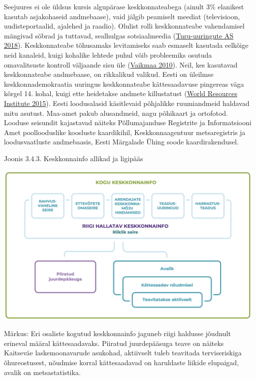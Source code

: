 \documentclass[estonian,]{article}
\begin{document}
Seejuures ei ole üldsus kursis algupärase keskkonnateabega (ainult 3\% elanikest kasutab asjakohaseid andmebaase), vaid jälgib peamiselt meediat (televisioon, uudisteportaalid, ajalehed ja raadio). Olulist rolli keskkonnateabe vahendamisel mängivad sõbrad ja tuttavad, sealhulgas sotsiaalmeedia (\protect\hyperlink{Turu-uuringute2018}{Turu-uuringute AS 2018}). Keskkonnateabe tõhusamaks levitamiseks saab esmaselt kasutada eelkõige neid kanaleid, kuigi kohalike lehtede puhul võib probleemiks osutuda omavalitsuste kontroll väljaande sisu üle (\protect\hyperlink{Vaikmaa2010}{Vaikmaa 2010}).
Neil, kes kasutavad keskkonnateabe andmebaase, on rikkalikud valikud. Eesti on üleilmse keskkonnademokraatia uuringus keskkonnateabe kättesaadavuse pingereas väga kõrgel 14. kohal, kuigi ette heidetakse andmete killustatust (\protect\hyperlink{World2015}{World Resources Institute 2015}). Eesti loodusalasid käsitlevaid põhjalikke ruumiandmeid haldavad mitu asutust. Maa-amet pakub alusandmeid, nagu põhikaart ja ortofotod. Looduse seisundit kajastavad näiteks Põllumajanduse Registrite ja Informatsiooni Amet poollooduslike koosluste kaardikihil, Keskkonnaagentuur metsaregistris ja loodusvaatluste andmebaasis, Eesti Märgalade Ühing soode kaardirakendusel.

{Joonis 3.4.3.} Keskkonnainfo allikad ja ligipääs

\begin{center}\includegraphics[width=0.9\linewidth]{figures/3-chapter/fig343} \end{center}

\begin{figure-comment}
{Märkus:} Eri osaliste kogutud keskkonnainfo jaguneb riigi haldusse
jõudnult erineval määral kättesaadavaks. Piiratud juurdepääsuga teave on
näiteks Kaitseväe laskemoonavarude asukohad, aktiivselt tuleb teavitada
terviseriskiga õhureostusest, nõudmise korral kättesaadavad on
haruldaste liikide elupaigad, avalik on metsastatistika.
\end{figure-comment}
\end{document}
